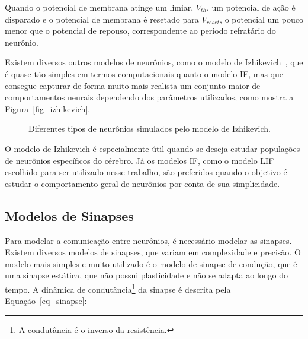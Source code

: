 Quando o potencial de membrana atinge um limiar, $V_{th}$, um potencial de ação é disparado e o potencial de membrana é resetado
para $V_{reset}$, o potencial um pouco menor que o potencial de repouso, correspondente ao período refratário do neurônio.

Existem diversos outros modelos de neurônios, como o modelo de Izhikevich~\cite{izhikevichSimple2003}, que é quase tão simples em
termos computacionais quanto o modelo IF, mas que consegue capturar de forma muito mais realista um conjunto maior de
comportamentos neurais dependendo dos parâmetros utilizados, como mostra a Figura~\ref{fig_izhikevich}.

\begin{figure}[!ht]
\caption{Diferentes tipos de neurônios simulados pelo modelo de Izhikevich.}
\end{figure}

O modelo de Izhikevich é especialmente útil quando se deseja estudar populações de neurônios específicos do cérebro. Já os modelos
IF, como o modelo LIF escolhido para ser utilizado nesse trabalho, são preferidos quando o objetivo é estudar o comportamento
geral de neurônios por conta de sua simplicidade.

\subsection{Modelos de Sinapses}\label{subsection_modelos_sinapses}

Para modelar a comunicação entre neurônios, é necessário modelar as sinapses. Existem diversos modelos de sinapses, que variam em
complexidade e precisão. O modelo mais simples e muito utilizado é o modelo de sinapse de condução, que é uma sinapse estática,
que não possui plasticidade e não se adapta ao longo do tempo. A dinâmica de condutância\footnote{A condutância é o inverso da
resistência.} da sinapse é descrita pela Equação~\ref{eq_sinapse}:

